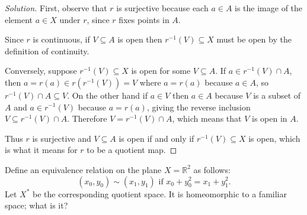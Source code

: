 \documentclass[10pt]{article}
\providecommand{\RR}{\mathbb R}
\providecommand{\inv}{^{-1}}
\newenvironment{soln}{\begin{proof}[Solution]}{\end{proof}}
\begin{document}
\begin{soln}
    First, observe that $r$ is surjective because each $a\in A$
    is the image of the element $a\in X$ under $r$,
    since $r$ fixes points in $A$.

    Since $r$ is continuous, if $V\subseteq A$ is open then
    $r\inv(V)\subseteq X$ must be open by the definition of continuity.

    Conversely, suppose $r\inv(V)\subseteq X$ is open for some $V\subseteq A$.
    If $a\in r\inv(V)\cap A$, then $a = r(a)\in r(r\inv(V)) = V$
    where $a = r(a)$ because $a\in A$, so $r\inv(V)\cap A\subseteq V$.
    On the other hand if $a\in V$ then $a\in A$ because $V$ is a subset of $A$
    and $a\in r\inv(V)$ because $a = r(a)$, giving the reverse inclusion
    $V\subseteq r\inv(V)\cap A$. Therefore $V = r\inv(V)\cap A$,
    which means that $V$ is open in $A$.

    Thus $r$ is surjective and
    $V\subseteq A$ is open if and only if $r\inv(V)\subseteq X$ is open,
    which is what it means for $r$ to be a quotient map.
\end{soln}

\pagebreak

\begin{problem}
    [Munkres 22.4a]
    Define an equivalence relation on the plane $X = \RR^2$ as follows:
    \begin{equation*}
	(x_0,y_0)\sim(x_1,y_1)\text{ if }x_0+y_0^2 = x_1+y_1^2.
    \end{equation*}
    Let $X^\ast$ be the corresponding quotient space.
    It is homeomorphic to a familiar space; what is it?
\end{problem}
\end{document}
